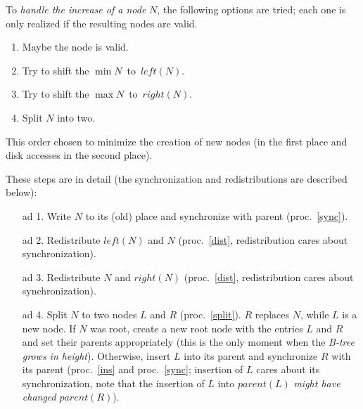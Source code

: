 \documentclass{vldb}
\begin{document}
\begin{proc} \label{inc}
To {\em handle the increase of a node} $N$, the following options are tried;
each one is only realized if the resulting nodes are valid.
\begin{enumerate}
\item Maybe the node is valid.
\item Try to shift the \mbox{$\min N$ to $left(N)$}.
\item Try to shift the \mbox{$\max N$ to $right(N)$}.
\item Split $N$ into two.
\end{enumerate}
This order chosen to minimize the creation of new nodes (in the first place and
disk accesses in the second place).

These steps are in detail (the synchronization and redistributions are 
described below):
\begin{enumerate}
\item[ad 1.] Write $N$ to its (old) place and synchronize with parent
    (proc.~\ref{sync}).
\item[ad 2.] Redistribute $left(N)$ and $N$ (proc.~\ref{dist},
    redistribution cares about synchronization).
\item[ad 3.] Redistribute $N$ and $right(N)$ (proc.~\ref{dist},
    redistribution cares about synchronization).
\item[ad 4.] Split $N$ to two nodes $L$ and $R$ (proc.~\ref{split}).
    $R$ replaces $N$, while $L$ is a new node.
    If $N$ was root, create a new root node with the entries $L$ and $R$ and
    set their parents appropriately (this is the only moment when the
    {\em B-tree grows in height}).
    Otherwise, insert $L$ into its parent and synchronize $R$ with its parent
    (proc.~\ref{ins} and proc.~\ref{sync}; insertion of $L$ cares about its
    synchronization, note that the insertion of $L$ into $parent(L)$
    {\em might have changed} $parent(R)$).
\end{enumerate}
\end{proc}
\end{document}
